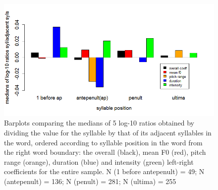 \documentclass[output=paper]{LSP/langsci}
\begin{document}
\begin{figure}
\includegraphics[width=\textwidth]{figures/BUC-img2_new.png}
\caption{Barplots comparing the medians of 5 log-10 ratios obtained by dividing the value for the syllable by that of its adjacent syllables in the word, ordered according to syllable position in the word from the right word boundary: the overall (black), mean F0 (red), pitch range (orange), duration (blue) and intensity (green) left-right coefficients for the entire sample. N (1 before antepenult) = 49; N (antepenult) = 136; N (penult) = 281; N (ultima) = 255}
\label{fig:buc:2}
\end{figure}
\end{document}
